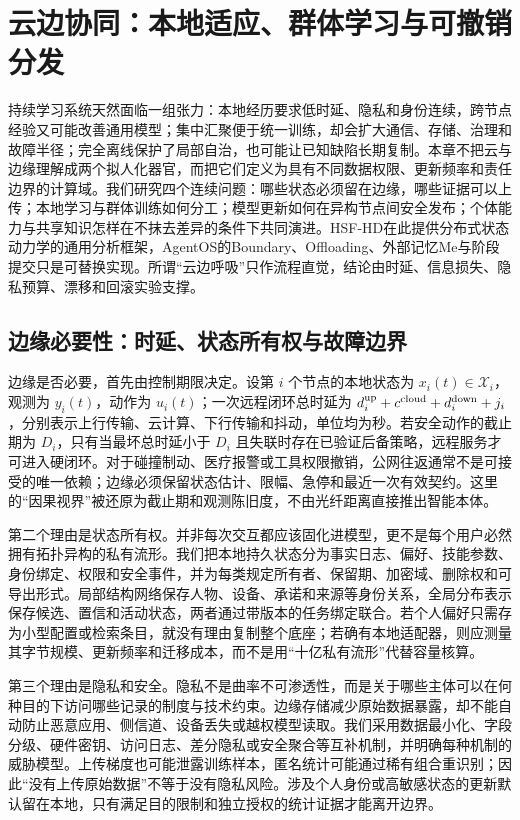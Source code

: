 \chapter{云边协同：本地适应、群体学习与可撤销分发}
\label{chp:cloud_edge_synergy}

持续学习系统天然面临一组张力：本地经历要求低时延、隐私和身份连续，跨节点经验又可能改善通用模型；集中汇聚便于统一训练，却会扩大通信、存储、治理和故障半径；完全离线保护了局部自治，也可能让已知缺陷长期复制。本章不把云与边缘理解成两个拟人化器官，而把它们定义为具有不同数据权限、更新频率和责任边界的计算域。我们研究四个连续问题：哪些状态必须留在边缘，哪些证据可以上传；本地学习与群体训练如何分工；模型更新如何在异构节点间安全发布；个体能力与共享知识怎样在不抹去差异的条件下共同演进。HSF-HD在此提供分布式状态动力学的通用分析框架，AgentOS的Boundary、Offloading、外部记忆Me与阶段提交只是可替换实现。所谓“云边呼吸”只作流程直觉，结论由时延、信息损失、隐私预算、漂移和回滚实验支撑。

\section{边缘必要性：时延、状态所有权与故障边界}
\label{sec:edge_necessity}

边缘是否必要，首先由控制期限决定。设第 $i$ 个节点的本地状态为 $x_i(t)\in\mathcal X_i$，观测为 $y_i(t)$，动作为 $u_i(t)$；一次远程闭环总时延为 $d_i^{\rm up}+c^{\rm cloud}+d_i^{\rm down}+j_i$，分别表示上行传输、云计算、下行传输和抖动，单位均为秒。若安全动作的截止期为 $D_i$，只有当最坏总时延小于 $D_i$ 且失联时存在已验证后备策略，远程服务才可进入硬闭环。对于碰撞制动、医疗报警或工具权限撤销，公网往返通常不是可接受的唯一依赖；边缘必须保留状态估计、限幅、急停和最近一次有效契约。这里的“因果视界”被还原为截止期和观测陈旧度，不由光纤距离直接推出智能本体。

第二个理由是状态所有权。并非每次交互都应该固化进模型，更不是每个用户必然拥有拓扑异构的私有流形。我们把本地持久状态分为事实日志、偏好、技能参数、身份绑定、权限和安全事件，并为每类规定所有者、保留期、加密域、删除权和可导出形式。局部结构网络保存人物、设备、承诺和来源等身份关系，全局分布表示保存候选、置信和活动状态，两者通过带版本的任务绑定联合。若个人偏好只需存为小型配置或检索条目，就没有理由复制整个底座；若确有本地适配器，则应测量其字节规模、更新频率和迁移成本，而不是用“十亿私有流形”代替容量核算。

第三个理由是隐私和安全。隐私不是曲率不可渗透性，而是关于哪些主体可以在何种目的下访问哪些记录的制度与技术约束。边缘存储减少原始数据暴露，却不能自动防止恶意应用、侧信道、设备丢失或越权模型读取。我们采用数据最小化、字段分级、硬件密钥、访问日志、差分隐私或安全聚合等互补机制，并明确每种机制的威胁模型。上传梯度也可能泄露训练样本，匿名统计可能通过稀有组合重识别；因此“没有上传原始数据”不等于没有隐私风险。涉及个人身份或高敏感状态的更新默认留在本地，只有满足目的限制和独立授权的统计证据才能离开边界。

